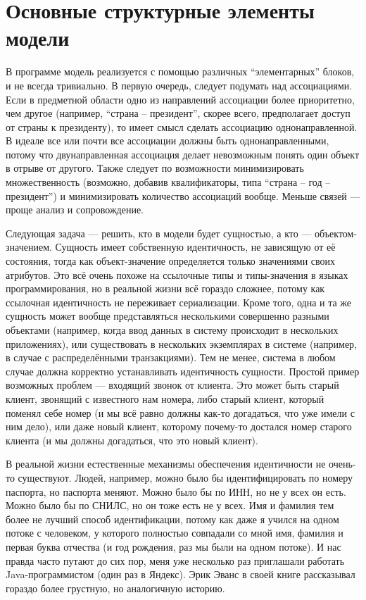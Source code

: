 \documentclass{../../text-style}
\begin{document}
\section{Основные структурные элементы модели}

В программе модель реализуется с помощью различных ``элементарных'' блоков, и не всегда тривиально. В первую очередь, следует подумать над ассоциациями. Если в предметной области одно из направлений ассоциации более приоритетно, чем другое (например, ``страна -- президент'', скорее всего, предполагает доступ от страны к президенту), то имеет смысл сделать ассоциацию однонаправленной. В идеале все или почти все ассоциации должны быть однонаправленными, потому что двунаправленная ассоциация делает невозможным понять один объект в отрыве от другого. Также следует по возможности минимизировать множественность (возможно, добавив квалификаторы, типа ``страна -- год -- президент'') и минимизировать количество ассоциаций вообще. Меньше связей --- проще анализ и сопровождение.

Следующая задача --- решить, кто в модели будет сущностью, а кто --- объектом-значением. Сущность имеет собственную идентичность, не зависящую от её состояния, тогда как объект-значение определяется только значениями своих атрибутов. Это всё очень похоже на ссылочные типы и типы-значения в языках программирования, но в реальной жизни всё гораздо сложнее, потому как ссылочная идентичность не переживает сериализации. Кроме того, одна и та же сущность может вообще представляться несколькими совершенно разными объектами (например, когда ввод данных в систему происходит в нескольких приложениях), или существовать в нескольких экземплярах в системе (например, в случае с распределёнными транзакциями). Тем не менее, система в любом случае должна корректно устанавливать идентичность сущности. Простой пример возможных проблем --- входящий звонок от клиента. Это может быть старый клиент, звонящий с известного нам номера, либо старый клиент, который поменял себе номер (и мы всё равно должны как-то догадаться, что уже имели с ним дело), или даже новый клиент, которому почему-то достался номер старого клиента (и мы должны догадаться, что это новый клиент).

В реальной жизни естественные механизмы обеспечения идентичности не очень-то существуют. Людей, например, можно было бы идентифицировать по номеру паспорта, но паспорта меняют. Можно было бы по ИНН, но не у всех он есть. Можно было бы по СНИЛС, но он тоже есть не у всех. Имя и фамилия тем более не лучший способ идентификации, потому как даже я учился на одном потоке с человеком, у которого полностью совпадали со мной имя, фамилия и первая буква отчества (и год рождения, раз мы были на одном потоке). И нас правда часто путают до сих пор, меня уже несколько раз приглашали работать Java-программистом (один раз в Яндекс). Эрик Эванс в своей книге рассказывал гораздо более грустную, но аналогичную историю.
\end{document}
